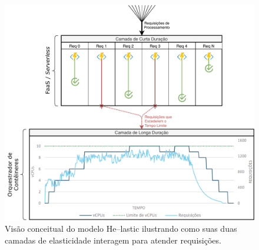 \documentclass[english,brazilian]{UNISINOSmonografia} %
\newcommand\defaultFigureWidth{0.9}
\begin{document}
\begin{figure}[tb]
	\centering%
	\begin{minipage}{\defaultFigureWidth\textwidth}
		\caption{Visão conceitual do modelo \textsf{He}--lastic ilustrando como suas duas camadas de elasticidade interagem para atender requisições.}
		\label{fig:modelo-conceitual}
		\vspace{.5ex}
		\includegraphics[width=\textwidth]{modelo-conceitual}
	\end{minipage}
\end{figure}
\end{document}
